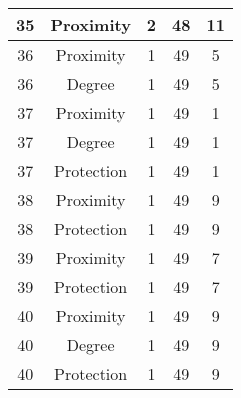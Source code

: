 \documentclass[results.tex]{subfiles}
\begin{document}
\begin{center}
\begin{tabular}{| c || c | c | c | c |}
            \hline
            35                      & Proximity                    & 2                      & 48                      & 11                   \\
            \hline
            36                      & Proximity                    & 1                      & 49                      & 5                    \\
            \hline
            36                      & Degree                       & 1                      & 49                      & 5                    \\
            \hline
            37                      & Proximity                    & 1                      & 49                      & 1                    \\
            \hline
            37                      & Degree                       & 1                      & 49                      & 1                    \\
            \hline
            37                      & Protection                   & 1                      & 49                      & 1                    \\
            \hline
            38                      & Proximity                    & 1                      & 49                      & 9                    \\
            \hline
            38                      & Protection                   & 1                      & 49                      & 9                    \\
            \hline
            39                      & Proximity                    & 1                      & 49                      & 7                    \\
            \hline
            39                      & Protection                   & 1                      & 49                      & 7                    \\
            \hline
            40                      & Proximity                    & 1                      & 49                      & 9                    \\
            \hline
            40                      & Degree                       & 1                      & 49                      & 9                    \\
            \hline
            40                      & Protection                   & 1                      & 49                      & 9                    \\

\end{tabular}
\end{center}
\end{document}

